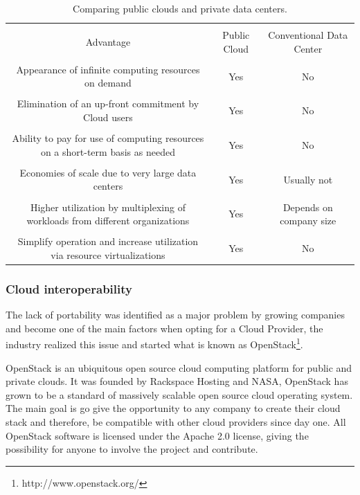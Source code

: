 \begin{table}
  \begin{tabular}{ c | c | c }
  \hline \\
  Advantage & Public Cloud & Conventional Data Center \\
  \hline \\
  Appearance of infinite computing resources on demand & Yes & No \\
  \hline \\
  Elimination of an up-front commitment by Cloud users & Yes & No \\
  \hline \\
  Ability to pay for use of computing resources on a short-term basis as needed & Yes & No \\
  \hline \\
  Economies of scale due to very large data centers & Yes & Usually not \\
  \hline \\
  Higher utilization by multiplexing of workloads from different organizations & Yes & Depends on company size \\
  \hline \\
  Simplify operation and increase utilization via resource virtualizations & Yes & No \\
  \hline  
  \end{tabular}
  \caption{Comparing public clouds and private data centers.}
  \label{tbl:advantagesofcloudcomputing}
\end{table}

\subsubsection{Cloud interoperability}

The lack of portability was identified as a major problem by growing companies and become one of the main factors when opting for a Cloud Provider, the industry realized this issue and started what is known as OpenStack\footnote{http://www.openstack.org/}.

OpenStack is an ubiquitous open source cloud computing platform for public and private clouds. It was founded by Rackspace Hosting and NASA, OpenStack has grown to be a standard of massively scalable open source cloud operating system. The main goal is go give the opportunity to any company to create their cloud stack and therefore, be compatible with other cloud providers since day one. All OpenStack software is licensed under the Apache 2.0 license, giving the possibility for anyone to involve the project and contribute. 

